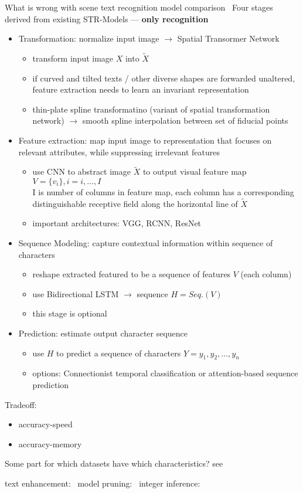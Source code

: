 What is wrong with scene text recognition model comparison~\cite{baek_what_2019}
Four stages derived from existing STR-Models --- \textbf{only recognition}
\begin{itemize}
    \item Transformation: normalize input image $\rightarrow$ Spatial Transormer Network
        \begin{itemize}
            \item transform input image $X$ into $\tilde{X}$
            \item if curved and tilted texts / other diverse shapes are forwarded unaltered,
                feature extraction needs to learn an invariant representation
            \item thin-plate spline transformatino (variant of spatial transformation network)
                $\rightarrow$ smooth spline interpolation between set of fiducial points
        \end{itemize}
    \item Feature extraction: map input image to representation that focuses on relevant attributes,
        while suppressing irrelevant features
        \begin{itemize}
            \item use \ac{CNN} to abstract image $\tilde{X}$ to output visual feature map
                $V=\{v_i\}, i=i,\ldots,I$\\
                I is number of columns in feature map, each column has a corresponding distinguishable
                receptive field along the horizontal line of $\tilde{X}$
            \item important architectures: VGG, RCNN, ResNet
        \end{itemize}
    \item Sequence Modeling: capture contextual information within sequence of characters
        \begin{itemize}
            \item reshape extracted featured to be a sequence of features $V$ (each column)
            \item use Bidirectional LSTM $\rightarrow$ sequence $H=Seq.(V)$
            \item this stage is optional
        \end{itemize}
    \item Prediction: estimate output character sequence
        \begin{itemize}
            \item use $H$ to predict a sequence of characters $Y=y_1,y_2,\ldots,y_n$
            \item options: Connectionist temporal classification or attention-based sequence prediction
        \end{itemize}
\end{itemize}
Tradeoff:
\begin{itemize}
    \item accuracy-speed
    \item accuracy-memory
\end{itemize}

Some part for which datasets have which characteristics? see~\cite{long_scene_2021}


text enhancement:~\cite{chen_text_2021}
model pruning:~\cite{niu_26ms_2019}
integer inference:~\cite{ignatov_ai_2019}
